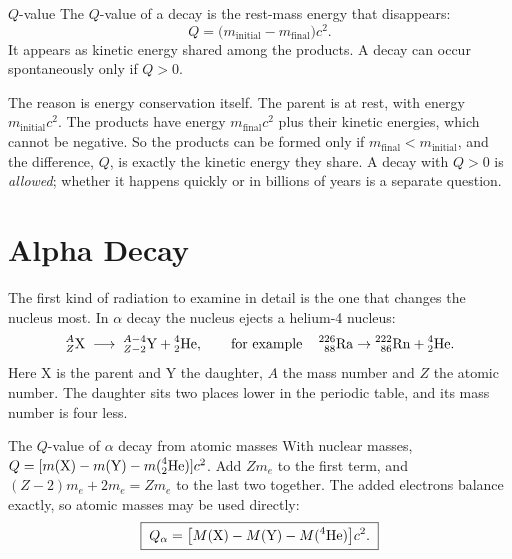 \begin{defbox}{$Q$-value}
The $Q$-value of a decay is the rest-mass energy that disappears:
\[
Q=\big(m_{\text{initial}}-m_{\text{final}}\big)c^2 .
\]
It appears as kinetic energy shared among the products. A decay can occur spontaneously only if $Q>0$.
\end{defbox}

The reason is energy conservation itself. The parent is at rest, with energy $m_{\text{initial}}c^2$. The
products have energy $m_{\text{final}}c^2$ plus their kinetic energies, which cannot be negative. So the
products can be formed only if $m_{\text{final}}<m_{\text{initial}}$, and the difference, $Q$, is exactly
the kinetic energy they share. A decay with $Q>0$ is \emph{allowed}; whether it happens quickly or in
billions of years is a separate question.


\section{Alpha Decay}\label{sec:decay-alpha}

The first kind of radiation to examine in detail is the one that changes the nucleus most. In
$\alpha$ decay the nucleus ejects a helium-4 nucleus:
\[
\prescript{A}{Z}{\mathrm{X}}\;\longrightarrow\;\prescript{A-4}{Z-2}{\mathrm{Y}}+\prescript{4}{2}{\mathrm{He}},\qquad\text{for example}\quad
\prescript{226}{88}{\mathrm{Ra}}\to\prescript{222}{86}{\mathrm{Rn}}+\prescript{4}{2}{\mathrm{He}}.
\]
Here X is the parent and Y the daughter, $A$ the mass number and $Z$ the atomic number. The daughter sits
two places lower in the periodic table, and its mass number is four less.

\begin{derivbox}{The $Q$-value of $\alpha$ decay from atomic masses}
With nuclear masses, $Q=[m(\mathrm{X})-m(\mathrm{Y})-m(\prescript{4}{2}{\mathrm{He}})]c^2$. Add $Zm_e$ to the first term, and
$(Z-2)m_e+2m_e=Zm_e$ to the last two together. The added electrons balance exactly, so atomic masses may be
used directly:
\begin{equation}\label{eq:decay-Qalpha}
\boxed{\;Q_\alpha=\big[M(\mathrm{X})-M(\mathrm{Y})-M(\prescript{4}{}{\mathrm{He}})\big]c^2 .\;}
\end{equation}
\end{derivbox}

